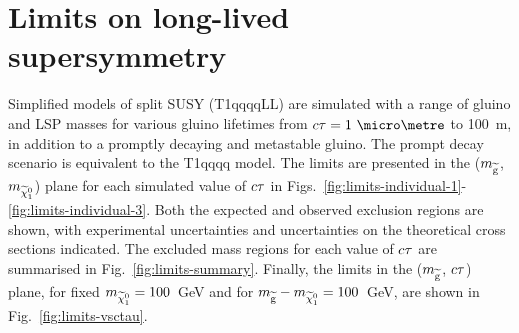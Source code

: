 \section{Limits on long-lived supersymmetry}
\label{sec:results-limits}
Simplified models of split SUSY (T1qqqqLL) are simulated with a range of gluino 
and LSP masses for various gluino lifetimes from $\ctau = 1~\micro\metre$ to 
100~m, in addition to a 
promptly decaying and metastable gluino. The prompt decay scenario is 
equivalent to the T1qqqq model. The limits are presented in 
the ($m_{\mathrm{\widetilde{g}}}$, $m_{\widetilde{\chi}_1^0}$) plane for each simulated value of $c\tau$ in 
Figs.~\ref{fig:limits-individual-1}-\ref{fig:limits-individual-3}.
Both the expected and observed exclusion regions are shown, with experimental 
uncertainties and uncertainties on the theoretical cross sections indicated. 
The excluded mass regions for each value of $c\tau$ are summarised in 
Fig.~\ref{fig:limits-summary}. 
Finally, the limits in the ($m_{\mathrm{\widetilde{g}}}$, $c\tau$) plane, for fixed $m_{\widetilde{\chi}_1^0}=100$~GeV 
and for $m_{\mathrm{\widetilde{g}}} - m_{\widetilde{\chi}_1^0} = 100$~GeV, are shown in Fig.~\ref{fig:limits-vsctau}.


